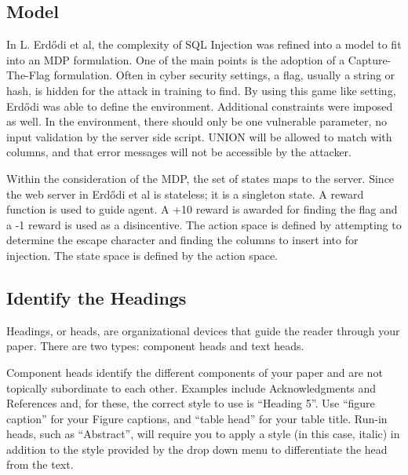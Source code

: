 \documentclass[conference]{IEEEtran}
\begin{document}


\subsection{Model}
In L. Erdődi et al, the complexity of SQL Injection was refined into a model to fit into an MDP formulation. One of the main points is the adoption of a Capture-The-Flag formulation. Often in cyber security settings, a flag, usually a string or hash, is hidden for the attack in training to find. By using this game like setting, Erdődi was able to define the environment. Additional constraints were imposed as well. In the environment, there should only be one vulnerable parameter, no input validation by the server side script. UNION will be allowed to match with columns, and that error messages will not be accessible by the attacker. 

Within the consideration of the MDP, the set of states maps to the server. Since the web server in Erdődi et al is stateless; it is a singleton state. A reward function is used to guide agent. A +10 reward is awarded for finding the flag and a -1 reward is used as a disincentive. The action space is defined by attempting to determine the escape character and finding the columns to insert into for injection. The state space is defined by the action space. 

\subsection{Identify the Headings}
Headings, or heads, are organizational devices that guide the reader through 
your paper. There are two types: component heads and text heads.

Component heads identify the different components of your paper and are not 
topically subordinate to each other. Examples include Acknowledgments and 
References and, for these, the correct style to use is ``Heading 5''. Use 
``figure caption'' for your Figure captions, and ``table head'' for your 
table title. Run-in heads, such as ``Abstract'', will require you to apply a 
style (in this case, italic) in addition to the style provided by the drop 
down menu to differentiate the head from the text.
\end{document}
